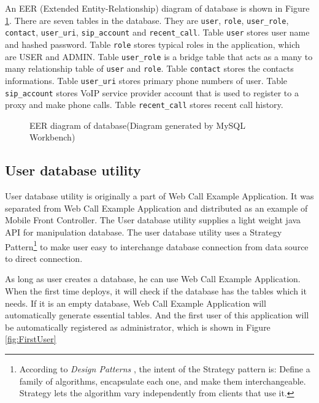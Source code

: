 An EER (Extended Entity-Relationship) diagram of database is shown in Figure \ref{fig:EERDiagram}. There are seven tables in the database. They are \texttt{user}, \texttt{role}, \texttt{user\_role}, \texttt{contact}, \texttt{user\_uri}, \texttt{sip\_account} and \texttt{recent\_call}. Table \texttt{user} stores user name and hashed password. Table \texttt{role} stores typical roles in the application, which are USER and ADMIN. Table \texttt{user\_role} is a bridge table that acts as a many to many relationship table of \texttt{user} and \texttt{role}. Table \texttt{contact} stores the contacts informations. Table \texttt{user\_uri} stores primary phone numbers of user. Table \texttt{sip\_account} stores VoIP service provider account that is used to register to a proxy and make phone calls. Table \texttt{recent\_call} stores recent call history.

\begin{figure}[!hbtp]
\centering
{}
\caption{EER diagram of database(Diagram generated by \textsf{MySQL Workbench})}
\label{fig:EERDiagram}
\end{figure} 

\subsection{User database utility}
\label{sec:WebApplication:Database:UserDatabaseUtility}

User database utility is originally a part of Web Call Example Application. It was separated from Web Call Example Application and distributed as an example of Mobile Front Controller. The User database utility supplies a light weight java API for manipulation database. The user database utility uses a Strategy Pattern\footnote{According to \textit{Design Patterns} \cite{DesignPatternGoF}, the intent of the Strategy pattern is: Define a family of algorithms, encapsulate each one, and make them interchangeable. Strategy lets the algorithm vary independently from clients that use it.} to make user easy to interchange database connection from data source to direct connection. 

As long as user creates a database, he can use Web Call Example Application. When the first time deploys, it will check if the database has the tables which it needs. If it is an empty database, Web Call Example Application will automatically generate essential tables. And the first user of this application will be automatically registered as administrator, which is shown in Figure \ref{fig:FirstUser}

